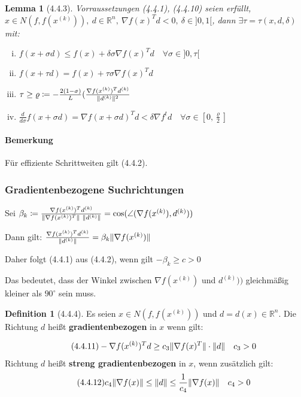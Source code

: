 \documentclass[ngerman,halfparskip]{scrartcl}
\DeclarePairedDelimiter{\norm}{\lVert}{\rVert}
\newtheorem*{lemma}{Lemma}
\theoremstyle{definition}
\newtheorem*{defin}{Definition}
\newcommand*{\R}{\mathbb{R}}      %
\begin{document}
\begin{lemma}[4.4.3]
Vorraussetzungen (4.4.1), (4.4.10) seien erfüllt, $x\in N(f,f(x^{(k)})),~ d\in\R^n,~ \nabla f(x)^Td<0,~ \delta \in ]0,1[$, dann $\exists \tau=\tau(x,d,\delta)$ mit:
\begin{enumerate}[(i)]
\item  $f(x+\sigma d)\leq f(x)+\delta\sigma\nabla f(x)^Td \quad \forall \sigma \in ]0,\tau[$
\item $f(x+\tau d)= f(x)+\tau\sigma\nabla f(x)^Td$
\item $\tau\geq \varrho \coloneqq -\frac{2(1-\sigma)}L( \frac{\nabla f(x^{(k)})^Td^{(k)}}{\norm{d^{(k)}}^2}$
\item  $\frac d{d\sigma}f(x+\sigma d)=\nabla f(x+\sigma d)^Td < \delta\nabla f^td \quad \forall \sigma \in [0,\frac \varrho 2]$ 
\end{enumerate}
\end{lemma}
\paragraph{Bemerkung} Für effiziente Schrittweiten gilt (4.4.2).

\subsubsection{Gradientenbezogene Suchrichtungen}
Sei $\beta_k\coloneqq \frac{\nabla f(x^{(k)})^Td^{(k)}}{\norm{\nabla f(x^{(k)})^T}~\norm{d^{(k)}}}=\cos(\angle(\nabla f(x^{(k)}),d^{(k)}))$

Dann gilt: $\frac{\nabla f(x^{(k)})^Td^{(k)}}{\norm{d^{(k)}}}=\beta_k \norm{\nabla f(x^{(k)})}$

Daher folgt (4.4.1) aus (4.4.2), wenn gilt $-\beta_k \geq c>0$

Das bedeutet, dass der Winkel zwischen $\nabla f(x^{(k)})$ und $d^{(k)}))$ gleichmäßig kleiner als $90^\circ$ sein muss.

\begin{defin}[4.4.4]
Es seien $x\in N(f,f(x^{(k)}))$ und $d=d(x)\in\R^n$. Die Richtung $d$ heißt \textbf{gradientenbezogen} in $x$ wenn gilt:

\begin{gather*}
\tag{4.4.11}-\nabla f(x^{(k)})^Td\geq c_3 \norm{\nabla f(x)^T}\cdot \norm{d} \quad c_3>0
\end{gather*}
Richtung $d$ heißt \textbf{streng gradientenbezogen} in $x$, wenn zusätzlich gilt:
\begin{gather*}
\tag{4.4.12}c_4\norm{\nabla f(x)}\leq \norm{d}\leq \frac 1{c_4}\norm{\nabla f(x)} \quad c_4>0
\end{gather*}
\end{defin}
\end{document}
